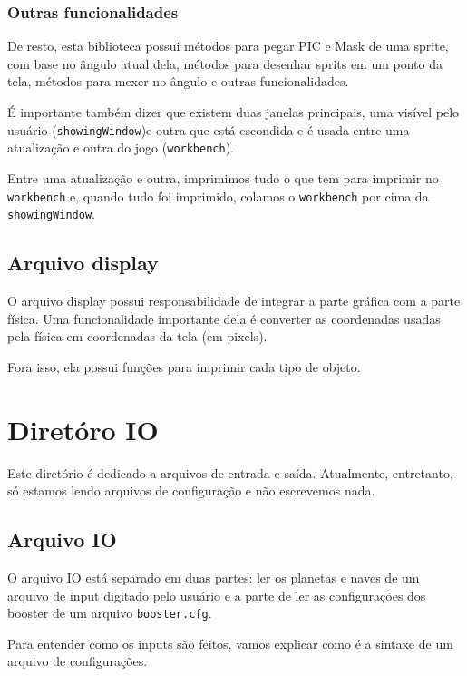 \documentclass[12pt, a4paper]{article}
\begin{document}
    \subsubsection{Outras funcionalidades}

    De resto, esta biblioteca possui métodos para pegar PIC e Mask de uma sprite,
    com base no ângulo atual dela, métodos para desenhar sprits em um ponto
    da tela, métodos para mexer no ângulo e outras funcionalidades.

    É importante também dizer que existem duas janelas principais, uma visível
    pelo usuário (\texttt{showingWindow})e outra que está escondida e
    é usada entre uma atualização e outra do jogo (\texttt{workbench}).

    Entre uma atualização e outra, imprimimos tudo o que tem para imprimir no
    \texttt{workbench} e, quando tudo foi imprimido, colamos o \texttt{workbench}
    por cima da \texttt{showingWindow}.


    \subsection{Arquivo display}

    O arquivo display possui responsabilidade de integrar a parte gráfica
    com a parte física. Uma funcionalidade importante dela é converter
    as coordenadas usadas pela física em coordenadas da tela (em pixels).

    Fora isso, ela possui funções para imprimir cada tipo de objeto.

    \newpage

    \section{Diretóro IO}

    Este diretório é dedicado a arquivos de entrada e saída. Atualmente, 
    entretanto, só estamos lendo arquivos de configuração e não escrevemos nada.

    \subsection{Arquivo IO}

    O arquivo IO está separado em duas partes: ler os planetas e naves de um 
    arquivo de input digitado pelo usuário e a parte de ler as configurações dos
    booster de um arquivo \texttt{booster.cfg}.
    
    Para entender como os inputs são feitos, vamos explicar como é a sintaxe
    de um arquivo de configurações.
\end{document}

